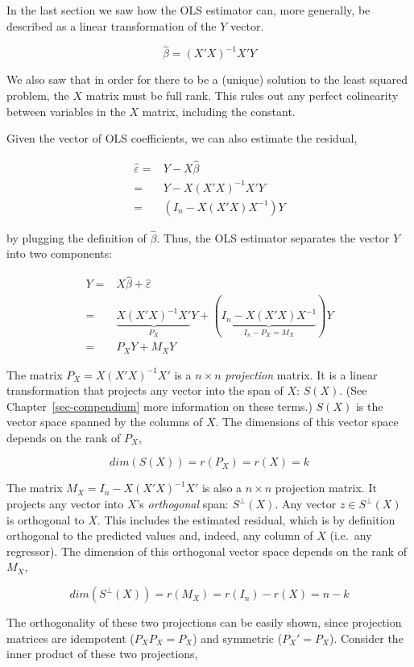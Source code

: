 \documentclass[
  letterpaper,
  DIV=11,
  numbers=noendperiod]{scrreprt}
\begin{document}
In the last section we saw how the OLS estimator can, more generally, be
described as a linear transformation of the \(Y\) vector.

\[
\hat{\beta} = (X'X)^{-1}X'Y
\]

We also saw that in order for there to be a (unique) solution to the
least squared problem, the \(X\) matrix must be full rank. This rules
out any perfect colinearity between variables in the \(X\) matrix,
including the constant.

Given the vector of OLS coefficients, we can also estimate the residual,

\[
\begin{align}
\hat{\varepsilon} =& Y - X\hat{\beta} \\
=&Y-X(X'X)^{-1}X'Y \\
=&(I_n-X(X'X)X^{-1})Y
\end{align}
\]

by plugging the definition of \(\hat{\beta}\). Thus, the OLS estimator
separates the vector \(Y\) into two components:

\[
\begin{align}
 Y =& X\hat{\beta} + \hat{\varepsilon}\\
=&\underbrace{X(X'X)^{-1}X'}_{P_X}Y + (\underbrace{I_n-X(X'X)X^{-1}}_{I_n-P_X = M_X})Y \\
=&P_XY + M_XY
\end{align}
\]

The matrix \(P_X = X(X'X)^{-1}X'\) is a \(n\times n\) \emph{projection}
matrix. It is a linear transformation that projects any vector into the
span of \(X\): \(S(X)\). (See Chapter~\ref{sec-compendium} more
information on these terms.) \(S(X)\) is the vector space spanned by the
columns of \(X\). The dimensions of this vector space depends on the
rank of \(P_X\),

\[
dim(S(X)) = r(P_X) = r(X) = k
\]

The matrix \(M_X = I_n-X(X'X)^{-1}X'\) is also a \(n\times n\)
projection matrix. It projects any vector into \(X\)'s \emph{orthogonal}
span: \(S^{\perp}(X)\). Any vector \(z\in S^{\perp}(X)\) is orthogonal
to \(X\). This includes the estimated residual, which is by definition
orthogonal to the predicted values and, indeed, any column of \(X\)
(i.e.~any regressor). The dimension of this orthogonal vector space
depends on the rank of \(M_X\),

\[
dim(S^{\perp}(X)) = r(M_X) = r(I_n)-r(X) = n-k
\]

The orthogonality of these two projections can be easily shown, since
projection matrices are idempotent (\(P_XP_X = P_X\)) and symmetric
(\(P_X' = P_X\)). Consider the inner product of these two projections,
\end{document}
